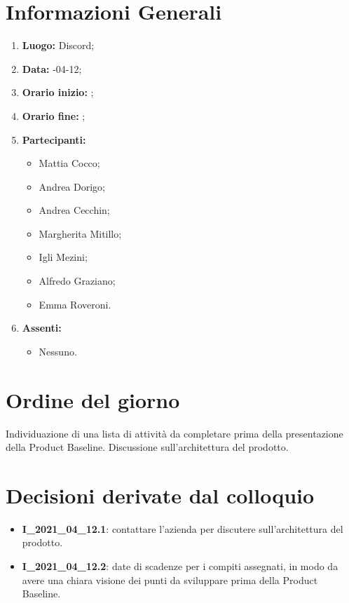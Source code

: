 \newpage
\section{Informazioni Generali}
\begin{enumerate}
	\item \textbf{Luogo:} \normalfont  Discord;
	\item \textbf{Data:} -04-12;
	\item \textbf{Orario inizio:} ;
	\item \textbf{Orario fine:} ;
	\item \textbf{Partecipanti:}
	\begin{itemize}
		\item Mattia Cocco;
		\item Andrea Dorigo;
		\item Andrea Cecchin;
		\item Margherita Mitillo;
		\item Igli Mezini;
		\item Alfredo Graziano;
		\item Emma Roveroni.
	\end{itemize}
	\item \textbf{Assenti:}
	\begin{itemize}
		\item Nessuno.
	\end{itemize}
\end{enumerate}
\section{Ordine del giorno}
Individuazione di una lista di attività da completare prima della presentazione della Product Baseline.
Discussione sull'architettura del prodotto. 

\section{Decisioni derivate dal colloquio}
\begin{itemize}
	\item \textbf{I\_2021\_04\_12.1}: contattare l'azienda per discutere sull'architettura del prodotto.
	\item \textbf{I\_2021\_04\_12.2}: date di scadenze per i compiti assegnati, in modo da avere una chiara visione dei punti da sviluppare prima della Product Baseline.
\end{itemize}